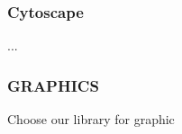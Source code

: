 \documentclass[10pt]{SelfArx} %
\begin{document}
\subsubsection*{Cytoscape}\label{sec:cytoscape}
...

\subsubsection*{GRAPHICS}\label{graphics}
Choose our library for graphic




\end{document}
